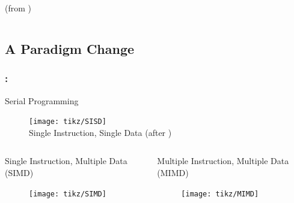\documentclass[9pt,xcolor=table]{beamer}
\begin{document}
\begin{frame}
\begin{columns}[c]
\begin{column}{.575\textwidth}
\begin{center}
        (from \cite{Sutter})
      \end{center}
    \end{column}
  \end{columns}
\end{frame}

\subsection{A Paradigm Change}
\begin{frame}
\frametitle{\insertsectionhead{}: \insertsubsectionhead{}}
\begin{alertblock}{Serial Programming}
  \begin{figure}[htb]
    \texttt{[image: tikz/SISD]}\\[2pt]
    Single Instruction, Single Data (after \cite{Flynn})
  \end{figure}

\end{alertblock}
\begin{columns}[c]
  \begin{column}{.47\textwidth}
    \begin{exampleblock}{Single Instruction, Multiple Data (SIMD)}
      \begin{figure}[htb]
        \texttt{[image: tikz/SIMD]}
      \end{figure}

    \end{exampleblock}
  \end{column}
    \begin{column}{.47\textwidth}
      \begin{exampleblock}{Multiple Instruction, Multiple Data (MIMD)}
      \begin{figure}[htb]
        \texttt{[image: tikz/MIMD]}
      \end{figure}
    \end{exampleblock}
    \end{column}
  \end{columns}
\end{frame}
\end{document}
